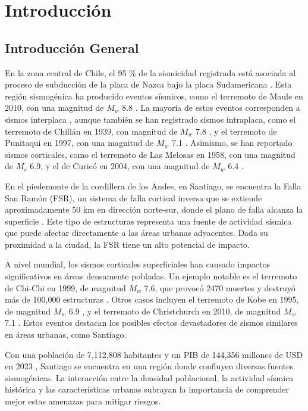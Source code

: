 \chapter{Introducción}
\section{Introducción General}

En la zona central de Chile, el 95 \% de la sismicidad registrada está asociada al proceso de subducción de la placa de Nazca bajo la placa Sudamericana . Esta región sismogénica ha producido eventos sísmicos, como el terremoto de Maule en 2010, con una magnitud de $M_w$ 8.8 . La mayoría de estos eventos corresponden a sismos interplaca , aunque también se han registrado sismos intraplaca, como el terremoto de Chillán en 1939, con magnitud de $M_w$ 7.8 , y el terremoto de Punitaqui en 1997, con una magnitud de $M_w$ 7.1 . Asimismo, se han reportado sismos corticales, como el terremoto de Las Melosas en 1958, con una magnitud de $M_s$ 6.9, y el de Curicó en 2004, con una magnitud de $M_w$ 6.4 .

En el piedemonte de la cordillera de los Andes, en Santiago, se encuentra la Falla San Ramón (FSR), un sistema de falla cortical inversa que se extiende aproximadamente 50 km en dirección norte-sur, donde el plano de falla alcanza la superficie . Este tipo de estructuras representa una fuente de actividad sísmica que puede afectar directamente a las áreas urbanas adyacentes. Dada su proximidad a la ciudad, la FSR tiene un alto potencial de impacto.

A nivel mundial, los sismos corticales superficiales han causado impactos significativos en áreas densamente pobladas. Un ejemplo notable es el terremoto de Chi-Chi en 1999, de magnitud $M_w$ 7.6, que provocó 2470 muertes y destruyó más de 100,000 estructuras . Otros casos incluyen el terremoto de Kobe en 1995, de magnitud $M_w$ 6.9 , y el terremoto de Christchurch en 2010, de magnitud $M_w$ 7.1 . Estos eventos destacan los posibles efectos devastadores de sismos similares en áreas urbanas, como Santiago.

Con una población de 7,112,808 habitantes  y un PIB de 144,356 millones de USD en 2023 , Santiago se encuentra en una región donde confluyen diversas fuentes sismogénicas. La interacción entre la densidad poblacional, la actividad sísmica histórica y las características urbanas subrayan la importancia de comprender mejor estas amenazas para mitigar riesgos.

